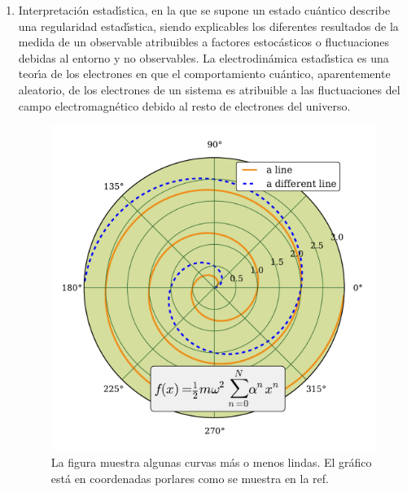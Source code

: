 \begin{enumerate}
\item Interpretaci\'{o}n estad\'{\i}stica, en la que se supone un estado cu\'{a}ntico describe una
  regularidad estad\'{\i}stica, siendo explicables los diferentes resultados de la medida de un
  observable atribuibles a factores estoc\'{a}sticos o fluctuaciones debidas al entorno y no
  observables. La electrodin\'{a}mica estad\'{\i}stica es una teor\'{\i}a de los electrones en que el
  comportamiento cu\'{a}ntico, aparentemente aleatorio, de los electrones de un sistema es
  atribuible a las fluctuaciones del campo electromagn\'{e}tico debido al resto de electrones
  del universo.
\begin{figure}[ht]
\centering\includegraphics[width=\imsize]{cap2_f1}
\caption[La figura muestra algunas curvas m\'{a}s o menos lindas]{La figura muestra algunas curvas m\'{a}s o menos lindas. El gr\'{a}fico est\'{a} en coordenadas porlares como se muestra en la ref.~}
\end{figure}



\end{enumerate}
